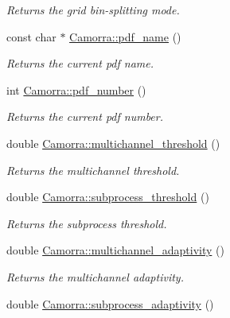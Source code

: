 \begin{DoxyCompactItemize}
\begin{DoxyCompactList}\small\item\em Returns the grid bin-\/splitting mode. \end{DoxyCompactList}\item 
\hypertarget{a00800_a2f7c6820df8813be79a94788715db133}{
const char $\ast$ \hyperlink{a00800_a2f7c6820df8813be79a94788715db133}{Camorra::pdf\_\-name} ()}
\label{a00800_a2f7c6820df8813be79a94788715db133}

\begin{DoxyCompactList}\small\item\em Returns the current pdf name. \end{DoxyCompactList}\item 
\hypertarget{a00800_a50db3e81e876becba1a5a0c20cef098e}{
int \hyperlink{a00800_a50db3e81e876becba1a5a0c20cef098e}{Camorra::pdf\_\-number} ()}
\label{a00800_a50db3e81e876becba1a5a0c20cef098e}

\begin{DoxyCompactList}\small\item\em Returns the current pdf number. \end{DoxyCompactList}\item 
\hypertarget{a00800_ac61ace3ceae1851c72e6e97d16cfdeb9}{
double \hyperlink{a00800_ac61ace3ceae1851c72e6e97d16cfdeb9}{Camorra::multichannel\_\-threshold} ()}
\label{a00800_ac61ace3ceae1851c72e6e97d16cfdeb9}

\begin{DoxyCompactList}\small\item\em Returns the multichannel threshold. \end{DoxyCompactList}\item 
\hypertarget{a00800_af1e467f7e98b5a4ec87e321916e43712}{
double \hyperlink{a00800_af1e467f7e98b5a4ec87e321916e43712}{Camorra::subprocess\_\-threshold} ()}
\label{a00800_af1e467f7e98b5a4ec87e321916e43712}

\begin{DoxyCompactList}\small\item\em Returns the subprocess threshold. \end{DoxyCompactList}\item 
\hypertarget{a00800_a8a3cd9f4acc73ceff9a10603cf104557}{
double \hyperlink{a00800_a8a3cd9f4acc73ceff9a10603cf104557}{Camorra::multichannel\_\-adaptivity} ()}
\label{a00800_a8a3cd9f4acc73ceff9a10603cf104557}

\begin{DoxyCompactList}\small\item\em Returns the multichannel adaptivity. \end{DoxyCompactList}\item 
\hypertarget{a00800_a8965d38dd51a83eeeb0c1217e462589a}{
double \hyperlink{a00800_a8965d38dd51a83eeeb0c1217e462589a}{Camorra::subprocess\_\-adaptivity} ()}
\label{a00800_a8965d38dd51a83eeeb0c1217e462589a}


\end{DoxyCompactItemize}
